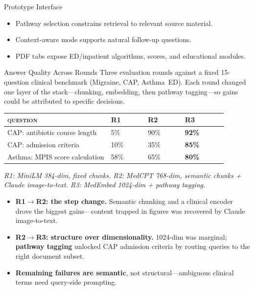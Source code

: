 \documentclass[final]{beamer}
\newlength{\onecolwid}
\begin{document}
\begin{frame}[t]
\begin{columns}[t]
\begin{column}{\onecolwid}
\begin{block}{Prototype Interface}
\vspace{0.7em}
\justifying
\begin{itemize}
\item Pathway selection constrains retrieval to relevant source material.
\item Context-aware mode supports natural follow-up questions.
\item PDF tabs expose ED/inpatient algorithms, scores, and educational modules.
\end{itemize}
\end{block}

\begin{block}{Answer Quality Across Rounds}
\small
Three evaluation rounds against a fixed 15-question clinical benchmark (Migraine, CAP, Asthma~ED). Each round changed one layer of the stack---chunking, embedding, then pathway tagging---so gains could be attributed to specific decisions.

\vspace{0.5em}
\setlength{\tabcolsep}{0.3em}
\renewcommand{\arraystretch}{1.25}
\begin{center}
\begin{tabular}{@{}p{0.42\linewidth} C{0.15\linewidth} C{0.15\linewidth} C{0.17\linewidth}@{}}
\textbf{\color{PathwaysGray}\scshape question}
 & \textbf{\color{PathwaysGray}\scshape R1}
 & \textbf{\color{PathwaysGray}\scshape R2}
 & \textbf{\color{PathwaysGray}\scshape R3}\\
\hline
CAP: antibiotic course length        & 5\%  & 90\% & \textbf{92\%} \\
CAP: admission criteria              & 10\% & 35\% & \textbf{85\%} \\
Asthma: MPIS score calculation       & 58\% & 65\% & \textbf{80\%} \\
\end{tabular}

\vspace{0.3em}
{\footnotesize\color{PathwaysGray}\itshape R1: MiniLM 384-dim, fixed chunks. R2: MedCPT 768-dim, semantic chunks + Claude image-to-text. R3: MedEmbed 1024-dim + pathway tagging.}
\end{center}

\vspace{0.4em}
\justifying
\begin{itemize}
\item \textbf{R1$\rightarrow$R2: the step change.} Semantic chunking and a clinical encoder drove the biggest gains---content trapped in figures was recovered by Claude image-to-text.
\item \textbf{R2$\rightarrow$R3: structure over dimensionality.} 1024-dim was marginal; \textbf{pathway tagging} unlocked CAP admission criteria by routing queries to the right document subset.
\item \textbf{Remaining failures are semantic}, not structural---ambiguous clinical terms need query-side prompting.
\end{itemize}
\end{block}


\end{column}
\end{columns}
\end{frame}
\end{document}
